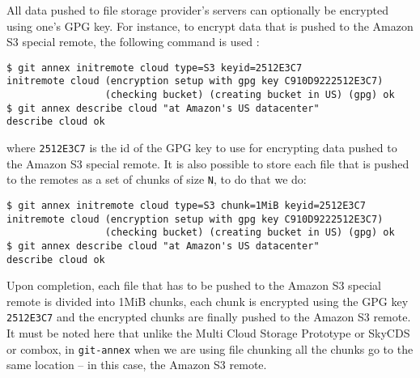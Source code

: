 All data pushed to file storage provider's servers can optionally be
encrypted using one's GPG key. For instance, to encrypt data that is
pushed to the Amazon S3 special remote, the following command is used
\cite{docs:git-annex-as3}:

\begin{verbatim}
$ git annex initremote cloud type=S3 keyid=2512E3C7
initremote cloud (encryption setup with gpg key C910D9222512E3C7)
                 (checking bucket) (creating bucket in US) (gpg) ok
$ git annex describe cloud "at Amazon's US datacenter"
describe cloud ok
\end{verbatim}

where \verb+2512E3C7+ is the id of the GPG key to use for encrypting
data pushed to the Amazon S3 special remote. It is also possible to
store each file that is pushed to the remotes as a set of chunks of
size \verb+N+, to do that we do:

\begin{verbatim}
$ git annex initremote cloud type=S3 chunk=1MiB keyid=2512E3C7
initremote cloud (encryption setup with gpg key C910D9222512E3C7)
                 (checking bucket) (creating bucket in US) (gpg) ok
$ git annex describe cloud "at Amazon's US datacenter"
describe cloud ok
\end{verbatim}

Upon completion, each file that has to be pushed to the Amazon S3
special remote is divided into 1MiB chunks, each chunk is encrypted
using the GPG key \verb+2512E3C7+ and the encrypted chunks are finally
pushed to the Amazon S3 remote. It must be noted here that unlike the
Multi Cloud Storage Prototype or SkyCDS or combox, in \verb+git-annex+
when we are using file chunking all the chunks go to the same location
-- in this case, the Amazon S3 remote.
